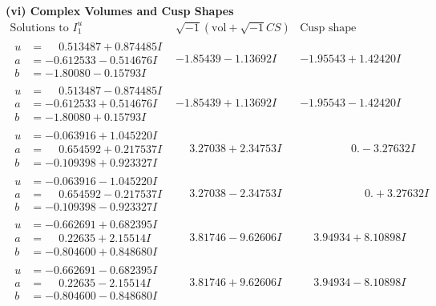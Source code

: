 \documentclass[1p]{elsarticle_modified}
\theoremstyle{definition}
\newcommand{\I}{\sqrt{-1}}
\begin{document}
\newpage\flushleft \textbf{(vi) Complex Volumes and Cusp Shapes}
$$\begin{array}{c|c|c}  
\text{Solutions to }I^u_{1}& \I (\text{vol} + \sqrt{-1}CS) & \text{Cusp shape}\\
 \hline 
\begin{aligned}
u &= \phantom{-}0.513487 + 0.874485 I \\
a &= -0.612533 - 0.514676 I \\
b &= -1.80080 - 0.15793 I\end{aligned}
 & -1.85439 - 1.13692 I & -1.95543 + 1.42420 I \\ \hline\begin{aligned}
u &= \phantom{-}0.513487 - 0.874485 I \\
a &= -0.612533 + 0.514676 I \\
b &= -1.80080 + 0.15793 I\end{aligned}
 & -1.85439 + 1.13692 I & -1.95543 - 1.42420 I \\ \hline\begin{aligned}
u &= -0.063916 + 1.045220 I \\
a &= \phantom{-}0.654592 + 0.217537 I \\
b &= -0.109398 + 0.923327 I\end{aligned}
 & \phantom{-}3.27038 + 2.34753 I & \phantom{-0.000000 } 0. - 3.27632 I \\ \hline\begin{aligned}
u &= -0.063916 - 1.045220 I \\
a &= \phantom{-}0.654592 - 0.217537 I \\
b &= -0.109398 - 0.923327 I\end{aligned}
 & \phantom{-}3.27038 - 2.34753 I & \phantom{-0.000000 -}0. + 3.27632 I \\ \hline\begin{aligned}
u &= -0.662691 + 0.682395 I \\
a &= \phantom{-}0.22635 + 2.15514 I \\
b &= -0.804600 + 0.848680 I\end{aligned}
 & \phantom{-}3.81746 - 9.62606 I & \phantom{-}3.94934 + 8.10898 I \\ \hline\begin{aligned}
u &= -0.662691 - 0.682395 I \\
a &= \phantom{-}0.22635 - 2.15514 I \\
b &= -0.804600 - 0.848680 I\end{aligned}
 & \phantom{-}3.81746 + 9.62606 I & \phantom{-}3.94934 - 8.10898 I \\ \hline\begin{aligned}

\end{aligned}
\end{array}$$
\end{document}
